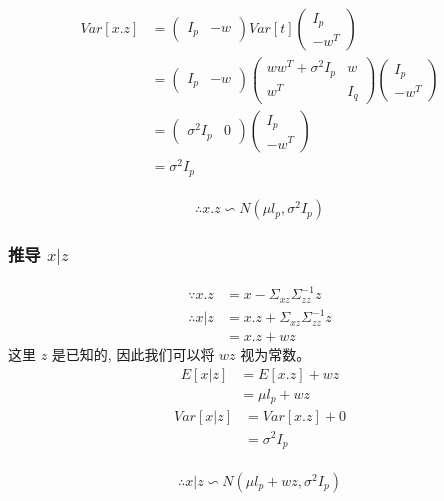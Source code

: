 \documentclass{report}
\begin{document}
\begin{equation}
\begin{aligned}
Var[x.z] 
&= 
\left (
\begin{matrix}
I_p & -w
\end{matrix}
\right )
Var[t]
 \left (
\begin{matrix}
I_p \\ -w^T
\end{matrix}
\right )\\
&= 
\left (
\begin{matrix}
I_p & -w
\end{matrix}
\right )
\left (
\begin{matrix}
ww^T + \sigma^2 I_p & w\\
w^T & I_q
\end{matrix}
\right )
\left (
\begin{matrix}
I_p \\ -w^T
\end{matrix}
\right )\\
&=
\left (
\begin{matrix}
\sigma^2 I_p & 0
\end{matrix}
\right )
\left (
\begin{matrix}
I_p \\ -w^T
\end{matrix}
\right )\\
&=\sigma^2 I_p
\end{aligned}
\end{equation}
\\
\begin{equation}
\therefore 
x.z \backsim N(\mu l_p, \sigma^2 I_p)
\end{equation}
\subsubsection{推导 $x|z$}
\begin{equation}
\begin{aligned}
\because 
x.z &= x - \Sigma_{xz} \Sigma_{zz}^{-1} z\\
\therefore 
x|z &= x.z + \Sigma_{xz} \Sigma_{zz}^{-1}z\\
&= x.z + wz
\end{aligned}
\end{equation}
这里 $z$ 是已知的, 因此我们可以将 $wz$ 视为常数。
\begin{equation}
\begin{aligned}
E[x|z] &= E[x.z] + wz\\
&= \mu l_p + wz
\end{aligned}
\end{equation}
\begin{equation}
\begin{aligned}
Var[x|z] &= Var[x.z] + 0\\
&= \sigma^2 I_p
\end{aligned}
\end{equation}\\
\begin{equation}
\therefore
x|z \backsim N(\mu l_p + wz, \sigma^2 I_p)
\end{equation}
\end{document}
